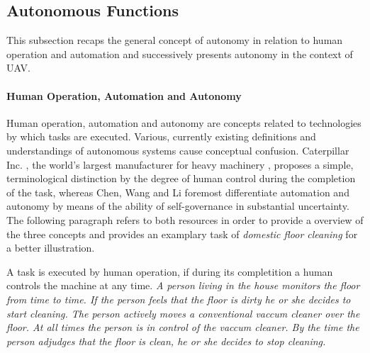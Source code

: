 \subsection{Autonomous Functions} \label{sub:UAVs_with_autonomous_functions}

This subsection recaps the general concept of autonomy in relation to human operation and automation
and successively presents autonomy in the context of UAV.


\paragraph{Human Operation, Automation and Autonomy}

Human operation, automation and autonomy are concepts related to technologies by which tasks are executed.
Various, currently existing definitions and understandings of autonomous systems cause conceptual confusion. \cite{Williams}
Caterpillar Inc. \cite{Caterpillar}, the world's largest manufacturer for heavy machinery \cite{Yang2009}, 
proposes a simple, terminological distinction by the degree of human control during the completion of the task,
whereas Chen, Wang and Li \cite{Chen2009} foremost differentiate automation and autonomy 
by means of the ability of self-governance in substantial uncertainty.
The following paragraph refers to both resources in order to provide a overview of the three concepts
and provides an examplary task of \textit{domestic floor cleaning} for a better illustration.

A task is executed by human operation, if during its completition a human controls the machine at any time. 
\textit{A person living in the house monitors the floor from time to time. 
If the person feels that the floor is dirty he or she decides to start cleaning.
The person actively moves a conventional vaccum cleaner over the floor. At all times the person is in control of the vaccum cleaner.
By the time the person adjudges that the floor is clean, he or she decides to stop cleaning.}

